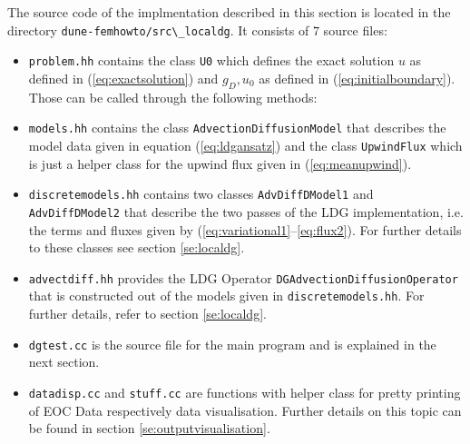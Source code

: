 The source code of the implmentation described in this section is located in
the directory \lstinline!dune-femhowto/src\_localdg!. It consists of $7$ source
files:
%
\begin{itemize}
  \item \lstinline!problem.hh! contains the class \lstinline!U0! which defines
    the exact solution $u$ as defined in (\ref{eq:exactsolution}) and $g_D, u_0$
    as defined in (\ref{eq:initialboundary}). Those can be called through the
    following methods:
      
    
  \item \lstinline!models.hh! contains the class
    \lstinline!AdvectionDiffusionModel! that describes the model data given in
    equation (\ref{eq:ldgansatz}) and the class \lstinline!UpwindFlux! which is
    just a helper class for the upwind flux given in (\ref{eq:meanupwind}).

  \item \lstinline!discretemodels.hh! contains two classes
    \lstinline!AdvDiffDModel1! and \lstinline!AdvDiffDModel2! that describe the
    two passes of the LDG implementation, i.e. the terms and fluxes given by
    (\ref{eq:variational1}--\ref{eq:flux2}). For further details to these classes
    see section \ref{se:localdg}.

  \item \lstinline!advectdiff.hh! provides the LDG Operator
    \lstinline!DGAdvectionDiffusionOperator! that is constructed out of the
    models given in \lstinline!discretemodels.hh!. For further details, refer
    to section \ref{se:localdg}.

  \item \lstinline!dgtest.cc! is the source file for the main program and is
    explained in the next section.

  \item \lstinline!datadisp.cc! and \lstinline!stuff.cc! are functions with helper class
    for pretty printing of EOC Data respectively data visualisation. Further
    details on this topic can be found in section \ref{se:outputvisualisation}.
%
\end{itemize}

